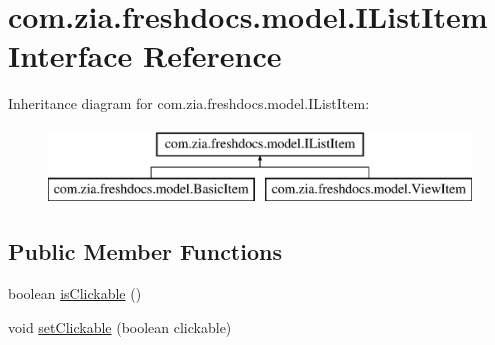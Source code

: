\hypertarget{interfacecom_1_1zia_1_1freshdocs_1_1model_1_1_i_list_item}{\section{com.\-zia.\-freshdocs.\-model.\-I\-List\-Item Interface Reference}
\label{interfacecom_1_1zia_1_1freshdocs_1_1model_1_1_i_list_item}
}
Inheritance diagram for com.\-zia.\-freshdocs.\-model.\-I\-List\-Item\-:\begin{figure}[H]
\begin{center}
\leavevmode
\includegraphics[height=2.000000cm]{interfacecom_1_1zia_1_1freshdocs_1_1model_1_1_i_list_item}
\end{center}
\end{figure}
\subsection*{Public Member Functions}
\begin{DoxyCompactItemize}
\item 
boolean \hyperlink{interfacecom_1_1zia_1_1freshdocs_1_1model_1_1_i_list_item_aea05f74f8dada0b6b6d20a109b487792}{is\-Clickable} ()
\item 
void \hyperlink{interfacecom_1_1zia_1_1freshdocs_1_1model_1_1_i_list_item_aec84f3e14be5cf897eeb34521fc8f232}{set\-Clickable} (boolean clickable)
\end{DoxyCompactItemize}


